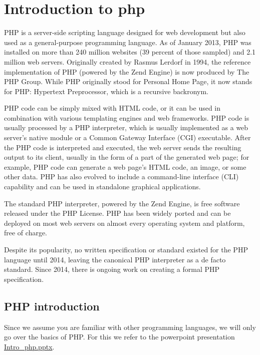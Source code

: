 \chapter{Introduction to php}

PHP is a server-side scripting language designed for web development but also used as a general-purpose programming language. As of January 2013, PHP was installed on more than 240 million websites (39 percent of those sampled) and 2.1 million web servers. Originally created by Rasmus Lerdorf in 1994, the reference implementation of PHP (powered by the Zend Engine) is now produced by The PHP Group. While PHP originally stood for Personal Home Page, it now stands for PHP: Hypertext Preprocessor, which is a recursive backronym.

PHP code can be simply mixed with HTML code, or it can be used in combination with various templating engines and web frameworks. PHP code is usually processed by a PHP interpreter, which is usually implemented as a web server's native module or a Common Gateway Interface (CGI) executable. After the PHP code is interpreted and executed, the web server sends the resulting output to its client, usually in the form of a part of the generated web page; for example, PHP code can generate a web page's HTML code, an image, or some other data. PHP has also evolved to include a command-line interface (CLI) capability and can be used in standalone graphical applications.

The standard PHP interpreter, powered by the Zend Engine, is free software released under the PHP License. PHP has been widely ported and can be deployed on most web servers on almost every operating system and platform, free of charge.

Despite its popularity, no written specification or standard existed for the PHP language until 2014, leaving the canonical PHP interpreter as a de facto standard. Since 2014, there is ongoing work on creating a formal PHP specification.

\section{PHP introduction}

Since we assume you are familiar with other programming languages, we will only go over the basics of PHP. For this we refer to the powerpoint presentation \url{Intro_php.pptx}.